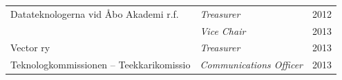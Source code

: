 \begin{tabularx}{\textwidth}{@{}X p{6cm} r@{}}
Datateknologerna vid Åbo Akademi r.f.
    & \textit{Treasurer} & 2012 \\
    & \textit{Vice Chair} & 2013 \\[0.3em]

Vector ry
    & \textit{Treasurer} & 2013 \\[0.3em]

Teknologkommissionen -- Teekkarikomissio
    & \textit{Communications Officer} & 2013 \\
\end{tabularx}
